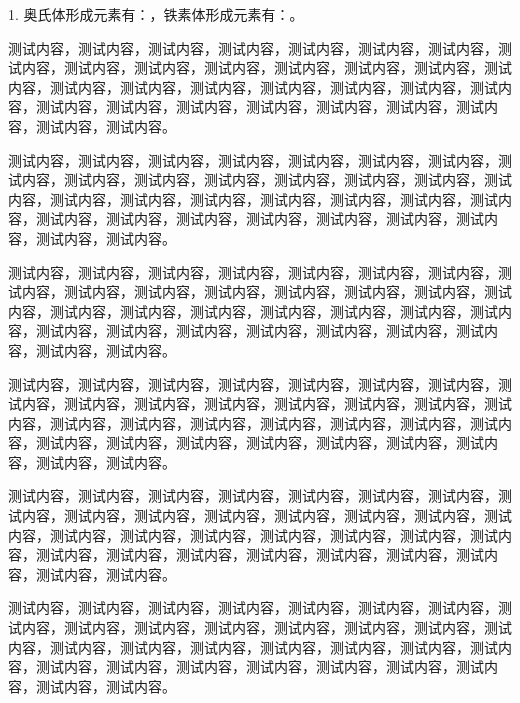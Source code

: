 \documentclass[twocolumn,answer,full,c5s]{HPUexam}
\begin{document}
\thispagestyle{HPUFirstPage}





1. 奥氏体形成元素有：\uline{}，铁素体形成元素有：\uline{}。

测试内容，测试内容，测试内容，测试内容，测试内容，测试内容，测试内容，测试内容，测试内容，测试内容，测试内容，测试内容，测试内容，测试内容，测试内容，测试内容，测试内容，测试内容，测试内容，测试内容，测试内容，测试内容，测试内容，测试内容，测试内容，测试内容，测试内容，测试内容，测试内容，测试内容，测试内容。

测试内容，测试内容，测试内容，测试内容，测试内容，测试内容，测试内容，测试内容，测试内容，测试内容，测试内容，测试内容，测试内容，测试内容，测试内容，测试内容，测试内容，测试内容，测试内容，测试内容，测试内容，测试内容，测试内容，测试内容，测试内容，测试内容，测试内容，测试内容，测试内容，测试内容，测试内容。

测试内容，测试内容，测试内容，测试内容，测试内容，测试内容，测试内容，测试内容，测试内容，测试内容，测试内容，测试内容，测试内容，测试内容，测试内容，测试内容，测试内容，测试内容，测试内容，测试内容，测试内容，测试内容，测试内容，测试内容，测试内容，测试内容，测试内容，测试内容，测试内容，测试内容，测试内容。
\vspace{25ex}



测试内容，测试内容，测试内容，测试内容，测试内容，测试内容，测试内容，测试内容，测试内容，测试内容，测试内容，测试内容，测试内容，测试内容，测试内容，测试内容，测试内容，测试内容，测试内容，测试内容，测试内容，测试内容，测试内容，测试内容，测试内容，测试内容，测试内容，测试内容，测试内容，测试内容，测试内容。

测试内容，测试内容，测试内容，测试内容，测试内容，测试内容，测试内容，测试内容，测试内容，测试内容，测试内容，测试内容，测试内容，测试内容，测试内容，测试内容，测试内容，测试内容，测试内容，测试内容，测试内容，测试内容，测试内容，测试内容，测试内容，测试内容，测试内容，测试内容，测试内容，测试内容，测试内容。

\vspace{45ex}

测试内容，测试内容，测试内容，测试内容，测试内容，测试内容，测试内容，测试内容，测试内容，测试内容，测试内容，测试内容，测试内容，测试内容，测试内容，测试内容，测试内容，测试内容，测试内容，测试内容，测试内容，测试内容，测试内容，测试内容，测试内容，测试内容，测试内容，测试内容，测试内容，测试内容，测试内容。
\end{document}
